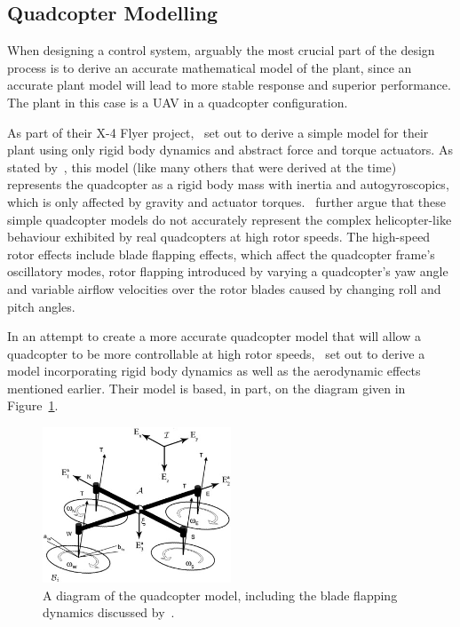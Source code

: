 \subsection{Quadcopter Modelling}

When designing a control system, arguably the most crucial part of the design process is to derive an accurate mathematical model of the plant, since an accurate plant model will lead to more stable response and superior performance. The plant in this case is a UAV in a quadcopter configuration. 

As part of their X-4 Flyer project,~\cite{hamel2002dynamic} set out to derive a simple model for their plant using only rigid body dynamics and abstract force and torque actuators. As stated by~\cite{Pounds2010c}, this model (like many others that were derived at the time) represents the quadcopter as a rigid body mass with inertia and autogyroscopics, which is only affected by gravity and actuator torques.~\citeauthor{Pounds2010c} further argue that these simple quadcopter models do not accurately represent the complex helicopter-like behaviour exhibited by real quadcopters at high rotor speeds. The high-speed rotor effects include blade flapping effects, which affect the quadcopter frame's oscillatory modes, rotor flapping introduced by varying a quadcopter's yaw angle and variable airflow velocities over the rotor blades caused by changing roll and pitch angles.

In an attempt to create a more accurate quadcopter model that will allow a quadcopter to be more controllable at high rotor speeds,~\citeauthor{Pounds2010c} set out to derive a model incorporating rigid body dynamics as well as the aerodynamic effects mentioned earlier. Their model is based, in part, on the diagram given in Figure~\ref{fig:chap2-quad-model}.

\begin{figure}
  \centering
  \includegraphics[width=0.5\textwidth]{figures/chapter2/pounds_quad-model.jpg}
  \caption[A diagram of the quadcopter model, including the blade flapping dynamics.]{A diagram of the quadcopter model, including the blade flapping dynamics discussed by~\cite{Pounds2010c}.}
\label{fig:chap2-quad-model}
\end{figure}

